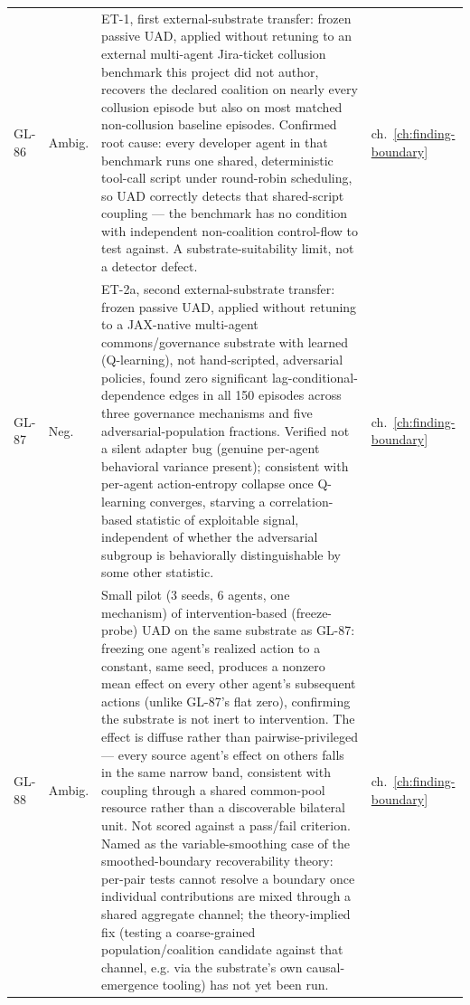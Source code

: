 \begin{longtable}{@{}L{0.05\textwidth}L{0.08\textwidth}L{0.55\textwidth}L{0.255\textwidth}@{}}
\label{finding:gl-86}GL-86 & Ambig. & ET-1, first external-substrate transfer: frozen passive UAD, applied without retuning to an external multi-agent Jira-ticket collusion benchmark this project did not author, recovers the declared coalition on nearly every collusion episode but also on most matched non-collusion baseline episodes. Confirmed root cause: every developer agent in that benchmark runs one shared, deterministic tool-call script under round-robin scheduling, so UAD correctly detects that shared-script coupling --- the benchmark has no condition with independent non-coalition control-flow to test against. A substrate-suitability limit, not a detector defect. & ch.~\ref{ch:finding-boundary} \\
\label{finding:gl-87}GL-87 & Neg. & ET-2a, second external-substrate transfer: frozen passive UAD, applied without retuning to a JAX-native multi-agent commons/governance substrate with learned (Q-learning), not hand-scripted, adversarial policies, found zero significant lag-conditional-dependence edges in all 150 episodes across three governance mechanisms and five adversarial-population fractions. Verified not a silent adapter bug (genuine per-agent behavioral variance present); consistent with per-agent action-entropy collapse once Q-learning converges, starving a correlation-based statistic of exploitable signal, independent of whether the adversarial subgroup is behaviorally distinguishable by some other statistic. & ch.~\ref{ch:finding-boundary} \\
\label{finding:gl-88}GL-88 & Ambig. & Small pilot (3 seeds, 6 agents, one mechanism) of intervention-based (freeze-probe) UAD on the same substrate as GL-87: freezing one agent's realized action to a constant, same seed, produces a nonzero mean effect on every other agent's subsequent actions (unlike GL-87's flat zero), confirming the substrate is not inert to intervention. The effect is diffuse rather than pairwise-privileged --- every source agent's effect on others falls in the same narrow band, consistent with coupling through a shared common-pool resource rather than a discoverable bilateral unit. Not scored against a pass/fail criterion. Named as the variable-smoothing case of the smoothed-boundary recoverability theory: per-pair tests cannot resolve a boundary once individual contributions are mixed through a shared aggregate channel; the theory-implied fix (testing a coarse-grained population/coalition candidate against that channel, e.g. via the substrate's own causal-emergence tooling) has not yet been run. & ch.~\ref{ch:finding-boundary} \\
\end{longtable}
\normalsize
\renewcommand{\arraystretch}{1.0}

